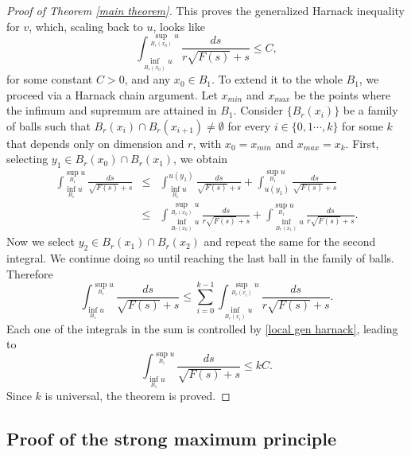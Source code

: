 \documentclass[12pt,a4paper]{amsart}
\numberwithin{equation}{section} %
\theoremstyle{definition}
\theoremstyle{remark}
\begin{document}
\begin{proof}[Proof of Theorem \ref{main theorem}]
This proves the generalized Harnack inequality for $v$, which, scaling back to $u$, looks like
\begin{equation}\label{local gen harnack}
    \int_{\inf_{B_r(x_0)}u}^{\sup_{B_r(x_0)}u}\frac{ds}{r\sqrt{F(s)} + s} \leq C,
\end{equation}
for some constant $C>0$, and any $x_0 \in B_1$. To extend it to the whole $B_1$, we proceed via a Harnack chain argument. Let $x_{min}$ and $x_{max}$ be the points where the infimum and supremum are attained in $B_1$. Consider $\{B_r(x_i)\}$ be a family of balls such that $B_r(x_i)\cap B_r(x_{i+1})\not = \emptyset$ for every $i \in \{0,1\cdots,k\}$ for some $k$ that depends only on dimension and $r$, with $x_0 = x_{min}$ and $x_{max} = x_k$. First, selecting $y_1 \in B_{r}(x_0)\cap B_r(x_{1})$, we obtain
\begin{eqnarray*}
   \int_{\inf_{B_1}u}^{\sup_{B_1}u}\frac{ds}{\sqrt{F(s)} + s} &\leq& \int_{\inf_{B_1}u}^{u(y_1)}\frac{ds}{\sqrt{F(s)} + s} + \int_{u(y_1)}^{\sup_{B_1}u}\frac{ds}{\sqrt{F(s)} + s}\\ 
   & \leq & \int_{\inf_{B_r(x_0)}u}^{\sup_{B_r(x_0)}u}\frac{ds}{r\sqrt{F(s)} + s} + \int_{\inf_{B_r(x_1)}u}^{\sup_{B_1}u}\frac{ds}{r\sqrt{F(s)} + s}.
\end{eqnarray*}
Now we select $y_2 \in B_r(x_1)\cap B_r(x_2)$ and repeat the same for the second integral. We continue doing so until reaching the last ball in the family of balls. Therefore
$$
    \int_{\inf_{B_1}u}^{\sup_{B_1}u}\frac{ds}{\sqrt{F(s)} + s} \leq \sum_{i=0}^{k-1} \int_{\inf_{B_r(x_i)}u}^{\sup_{B_r(x_{i})}u}\frac{ds}{r\sqrt{F(s)}+s}.
$$
Each one of the integrals in the sum is controlled by \eqref{local gen harnack}, leading to
$$
   \int_{\inf_{B_1}u}^{\sup_{B_1}u}\frac{ds}{\sqrt{F(s)} + s} \leq kC.
$$
Since $k$ is universal, the theorem is proved.
\end{proof}

\subsection{Proof of the strong maximum principle}\label{max princ-subsct}
\end{document}
